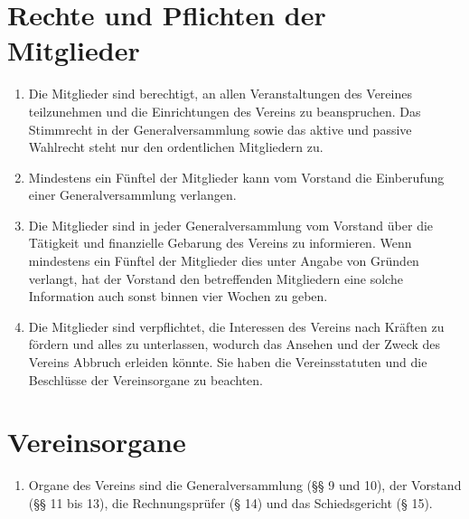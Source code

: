 \documentclass[a4paper,12pt]{article}
\begin{document}
\section{Rechte und Pflichten der Mitglieder} %
\label{sec:rechte-und-pflichten}
\begin{enumerate}
\item\label{item:mitglieder-stimmrecht} Die Mitglieder sind berechtigt, an allen Veranstaltungen des Vereines teilzunehmen und die Einrichtungen des Vereins zu beanspruchen. Das Stimmrecht in der Generalversammlung sowie das aktive und passive Wahlrecht steht nur den ordentlichen Mitgliedern zu.

\item Mindestens ein Fünftel der Mitglieder kann vom Vorstand die Einberufung einer Generalversammlung verlangen.

\item Die Mitglieder sind in jeder Generalversammlung vom Vorstand über die Tätigkeit und finanzielle Gebarung des Vereins zu informieren. Wenn mindestens ein Fünftel der Mitglieder dies unter Angabe von Gründen verlangt, hat der Vorstand den betreffenden Mitgliedern eine solche Information auch sonst binnen vier Wochen zu geben.

\item Die Mitglieder sind verpflichtet, die Interessen des Vereins nach Kräften zu fördern und alles zu unterlassen, wodurch das Ansehen und der Zweck des Vereins Abbruch erleiden könnte. Sie haben die Vereinsstatuten und die Beschlüsse der Vereinsorgane zu beachten.
\end{enumerate}

\section{Vereinsorgane} %
\begin{enumerate}
\item Organe des Vereins sind die Generalversammlung (§§ 9 und 10), der Vorstand (§§ 11 bis 13), die Rechnungsprüfer (§ 14) und das Schiedsgericht (§ 15).
\end{enumerate}
\end{document}
